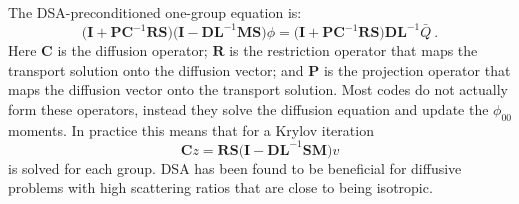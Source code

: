 \documentclass[12pt]{article}
\newcommand{\ve}[1]{\ensuremath{\mathbf{#1}}}
\begin{document}
The DSA-preconditioned one-group equation is:
%
\begin{equation}
  \bigl(\ve{I} + \ve{PC}^{-1}\ve{RS}\bigr) \bigl(\ve{I} - \ve{DL}^{-1}\ve{MS}\bigr) \phi = \bigl(\ve{I} + \ve{PC}^{-1}\ve{RS}\bigr)\ve{DL}^{-1}\bar{Q} \:. 
  \label{DSA1group}
\end{equation}
%
Here $\ve{C}$ is the diffusion operator; %
$\ve{R}$ is the restriction operator that maps the transport solution onto the diffusion vector; and $\ve{P}$ is the projection operator that maps the diffusion vector onto the transport solution. Most codes do not actually form these operators, instead they solve the diffusion equation and update the $\phi_{00}$ moments. In practice this means that for a Krylov iteration
%
\begin{equation}
  \ve{C}z = \ve{RS}\bigl(\ve{I} - \ve{DL}^{-1}\ve{SM}\bigr) v
\end{equation}
%
is solved for each group. DSA has been found to be beneficial for diffusive problems with high scattering ratios that are close to being isotropic. %


\end{document}
